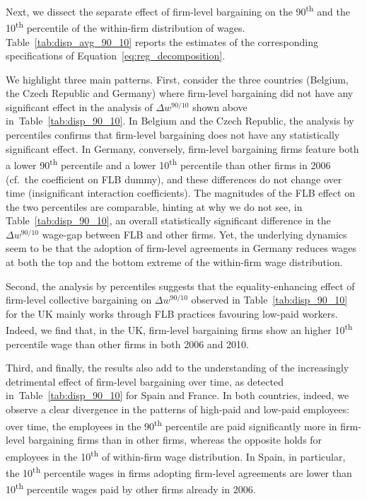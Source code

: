 \documentclass[12pt]{article}
\begin{document}
Next, we dissect the separate effect of firm-level bargaining on the
90\textsuperscript{th} and the 10\textsuperscript{th} percentile of
the within-firm distribution of wages. Table~\ref{tab:disp_avg_90_10}
reports the estimates of the corresponding specifications of
Equation~\ref{eq:reg_decomposition}.  

We highlight three main patterns. First, consider the three countries
(Belgium, the Czech Republic and Germany) where firm-level bargaining did
not have any significant effect in the analysis of $\Delta w^{90/10}$
shown above in~Table~\ref{tab:disp_90_10}. In Belgium and the Czech
Republic, the analysis by percentiles confirms that firm-level
bargaining does not have any statistically significant effect. In
Germany, conversely, firm-level bargaining firms feature both a lower
90\textsuperscript{th} percentile and a lower 10\textsuperscript{th}
percentile than other firms in 2006 (cf.~the coefficient on FLB
dummy), and these differences do not change over time (insignificant
interaction coefficients). The magnitudes of the FLB effect on the two
percentiles are comparable, hinting at why we do not see, in
Table~\ref{tab:disp_90_10}, an overall statistically significant
difference in the $\Delta w^{90/10}$ wage-gap between FLB and other
firms. Yet, the underlying dynamics seem to be that the adoption of
firm-level agreements in Germany reduces wages at both the top and the
bottom extreme of the within-firm wage distribution.

Second, the analysis by percentiles suggests that the
equality-enhancing effect of firm-level collective bargaining on
$\Delta w^{90/10}$ observed in Table~\ref{tab:disp_90_10} for the UK
mainly works through FLB practices favouring low-paid workers. Indeed,
we find that, in the UK, firm-level bargaining firms show an higher
10\textsuperscript{th} percentile wage than other firms in both 2006
and 2010.

Third, and finally, the results also add to the understanding of the
increasingly detrimental effect of firm-level bargaining over time, as
detected in~Table~\ref{tab:disp_90_10} for Spain and France. In both
countries, indeed, we observe a clear divergence in the patterns of
high-paid and low-paid employees: over time, the employees in the
90\textsuperscript{th} percentile are paid significantly more in
firm-level bargaining firms than in other firms, whereas the opposite
holds for employees in the 10\textsuperscript{th} of within-firm wage
distribution. In Spain, in particular, the 10\textsuperscript{th}
percentile wages in firms adopting firm-level agreements are lower
than 10\textsuperscript{th} percentile wages paid by other firms
already in 2006.
\end{document}
